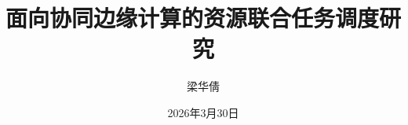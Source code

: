 \documentclass[unicode,pdfcover]{scutthesis} %
\renewcommand{\chaptermark}[1]{\markboth{\chaptername\ #1}{}}
\begin{document}
	\title{面向协同边缘计算的资源联合任务调度研究}	
	\author{梁华倩}	
	\date{2026年3月30日}
	\maketitle	
	\frontmatter	%
	\tableofcontents	%
	\begingroup
		\renewcommand*{\addvspace}[1]{}
		\newcommand{\loflabel}{图} 
		\renewcommand{\numberline}[1]{\loflabel~#1\hspace*{1em}}	
		\listoffigures
		
	\endgroup

	
	\mainmatter %
	
    \pagestyle{fancy}	%

	\backmatter %
	\renewcommand{\chaptermark}[1]{\markboth{#1}{}}
	\printbibliography	%
% 	
\end{document}
